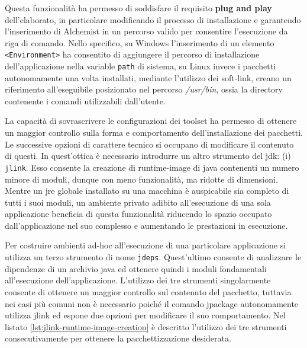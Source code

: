 Questa funzionalità ha permesso di soddisfare il requisito \textbf{plug and play} dell'elaborato, in particolare modificando il processo di installazione e garantendo l'inserimento di Alchemist in un percorso valido per consentire l'esecuzione da riga di comando. Nello specifico, su Windows l'inserimento di un elemento \texttt{<Environment>} ha consentito di aggiungere il percorso di installazione dell'applicazione nella variable \texttt{path} di sistema, su Linux invece i pacchetti autonomamente una volta installati, mediante l'utilizzo dei soft-link, creano un riferimento all'eseguibile posizionato nel percorso \textit{/usr/bin}, ossia la directory contenente i comandi utilizzabili dall'utente.

La capacità di sovrascrivere le configurazioni dei toolset ha permesso di ottenere un maggior controllo sulla forma e comportamento dell'installazione dei pacchetti. Le successive opzioni di carattere tecnico si occupano di modificare il contenuto di questi. In quest'ottica è necessario introdurre un altro strumento del \ac{jdk}: (i) \texttt{jlink}. Esso consente la creazione di runtime-image di java contenenti un numero minore di moduli, dunque con meno funzionalità, ma ridotte di dimensioni. Mentre un \ac{jre} globale installato su una macchina è auspicabile sia completo di tutti i suoi moduli, un ambiente privato adibito all'esecuzione di una sola applicazione beneficia di questa funzionalità riducendo lo spazio occupato dall'applicazione nel suo complesso e aumentando le prestazioni in esecuzione. 

Per costruire ambienti ad-hoc all'esecuzione di una particolare applicazione si utilizza un terzo strumento di nome \texttt{jdeps}. Quest'ultimo consente di analizzare le dipendenze di un archivio java ed ottenere quindi i moduli fondamentali all'esecuzione dell'applicazione. L'utilizzo dei tre strumenti singolarmente consente di ottenere un maggior controllo sul contenuto del pacchetto, tuttavia nei casi più comuni non è necessario poiché il comando jpackage autonomamente utilizza jlink ed espone due opzioni per modificare il suo comportamento. Nel listato \ref{lst:jlink-runtime-image-creation} è descritto l'utilizzo dei tre strumenti consecutivamente per ottenere la pacchettizzazione desiderata.




